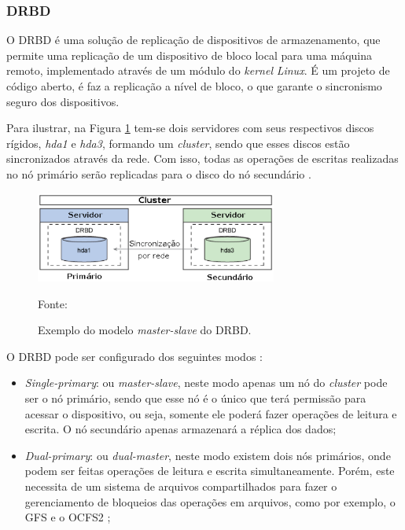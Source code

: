 \subsubsection{DRBD}
\label{section:drbd}
O \ac{DRBD} \cite{drbd} é uma solução de replicação de dispositivos de armazenamento, que permite uma replicação de um dispositivo de bloco local 
para uma máquina remoto, implementado através de um módulo do \textit{kernel} \textit{Linux}. É um projeto de código aberto, é faz a replicação a 
nível de bloco, o que garante o sincronismo seguro dos dispositivos. 

Para ilustrar, na Figura \ref{fig:drbd_basic} tem-se dois servidores com seus respectivos discos rígidos, \textit{hda1} e \textit{hda3}, formando 
um \textit{cluster}, sendo que esses discos estão sincronizados através da rede. Com isso, todas as operações de escritas realizadas no nó primário 
serão replicadas para o disco do nó secundário \cite{zaminhani2008}.

\begin{figure}[h!]
 \centering
 \includegraphics[width=300px]{img/drbd_basic.eps}
 \caption{Exemplo do modelo \textit{master-slave} do \ac{DRBD}.}
 Fonte: \citet{jones2010}
 \label{fig:drbd_basic}
\end{figure}

O \ac{DRBD} pode ser configurado dos seguintes modos \cite{drbd}:
\begin{itemize}
 \item \textit{Single-primary}: ou \textit{master-slave}, neste modo apenas um nó do \textit{cluster} pode ser o nó primário, sendo que esse nó 
 é o único que terá permissão para acessar o dispositivo, ou seja, somente ele poderá fazer operações de leitura e escrita. O nó 
 secundário apenas armazenará a réplica dos dados;
 \item \textit{Dual-primary}: ou \textit{dual-master}, neste modo existem dois nós primários, onde podem ser feitas operações de leitura e escrita 
 simultaneamente. Porém, este necessita de um sistema de arquivos compartilhados para fazer o gerenciamento de bloqueios das operações em arquivos, 
 como por exemplo, o \ac{GFS} \cite{gfs} e o \ac{OCFS2} \cite{ocfs2};
\end{itemize}

